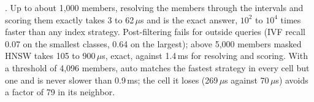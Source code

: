 .
Up to about 1,000 members, resolving the members through the intervals and scoring
them exactly takes 3 to 62\,$\mu$s and is the exact answer, $10^2$ to $10^4$
times faster than any index strategy.
Post-filtering fails for outside queries (IVF recall 0.07 on the smallest classes,
0.64 on the largest); above 5,000 members masked HNSW takes 105 to 900\,$\mu$s,
exact, against 1.4\,ms for resolving and scoring.
With a threshold of 4,096 members, auto matches the fastest strategy in every cell
but one and is never slower than 0.9\,ms; the cell it loses (269\,$\mu$s against
70\,$\mu$s) avoids a factor of 79 in its neighbor.
